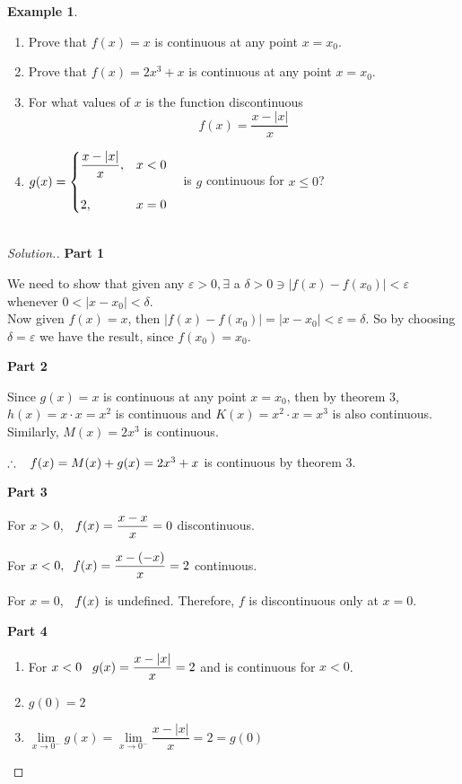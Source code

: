 \documentclass[11pt,a4paper]{article}
\theoremstyle{definition}
\newtheorem{exa}[thm]{Example}
\newenvironment{solution}
  {\renewcommand{\qedsymbol}{}\begin{proof}[\textit{Solution}.]}
  {\end{proof}}
\newcommand{\subhead}[1]{%
  \par\medskip\noindent\textbf{#1}\par\nobreak\smallskip}
\begin{document}
\begin{exa}
\begin{enumerate}
\item Prove that $f(x) = x$ is continuous at any point $x = x_0$.
\item Prove that $f(x) = 2x^3 + x$ is continuous at any point $x = x_0$.
\item For what values of $x$ is the function discontinuous $$ f(x) = \frac{x - |x|}{x}$$
\item $\displaystyle{ g(x) = 
\begin{cases}
\dfrac{x - |x|}{x}, & x < 0\\\\
2, & x = 0\\
\end{cases}}\hspace{0.3cm}$ is $g$ continuous for $x \leq 0$?\\\\
\end{enumerate}
\end{exa}

\begin{solution}
\subhead{Part 1}
We need to show that given any $\varepsilon > 0, \exists $ a $\delta > 0\ni \left|f(x) - f(x_0)\right| < \varepsilon $\\ whenever $0<\left|x - x_0\right|< \delta$.\\
Now given $f(x) = x$, then $\left|f(x) - f(x_0)\right| = \left|x - x_0\right| < \varepsilon = \delta $. So by choosing $\delta = \varepsilon $ we have the result, since $f(x_0) = x_0$.\\

\subhead{Part 2}
Since $g(x) = x$ is continuous at any point $x = x_0$, then by theorem 3, $h(x) = x\cdot x = x^2$ is continuous and $K(x) = x^2\cdot x = x^3$ is also continuous. Similarly, $M(x) = 2x^3$ is continuous.

$\therefore\hspace{0.3cm} f(x) = M(x) + g(x) = 2x^3 + x$ is continuous by theorem 3.

\subhead{Part 3}
For $x> 0$, $\hspace{0.2cm} f(x) = \dfrac{x - x}{x} =  0$ discontinuous.

For $x< 0,\hspace{0.2cm} f(x) = \dfrac{x - (-x)}{x} = 2$ continuous.

For $x = 0$, $\hspace{0.2cm} f(x)$ is undefined. Therefore, $f$ is discontinuous only at $x = 0$.

\subhead{Part 4}
\begin{enumerate}
       \item For $x< 0\hspace{0.3cm} g(x) = \dfrac{x - |x|}{x} = 2$ and is continuous for $x<0$.

       \item $g(0) = 2$

       \item $\displaystyle{\lim\limits_{x \rightarrow 0^-} g(x) = \lim\limits_{x \rightarrow 0^-} \dfrac{x - |x|}{x} = 2 = g(0)}$
\end{enumerate}
\end{solution}
\end{document}
